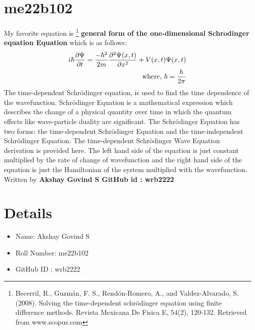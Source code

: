 \section*{me22b102}
My favorite equation is \footnote[1]{Becerril, R., Guzmán, F. S., Rendón-Romero, A., and Valdez-Alvarado, S. (2008). Solving the time-dependent schrödinger equation using finite difference methods. Revista Mexicana De Fisica E, 54(2), 120-132. Retrieved from www.scopus.com } \textbf{general form of the one-dimensional  Schr$\mathbf{\ddot{o}}$dinger equation  Equation} which is as follows: 
\begin{eqnarray}
    \label{Schrodinger's equation}
    i\hbar{\partial \Psi \over \partial t} = {- \hbar^2 \over 2m} {\partial^2 \Psi(x,t) \over \partial x^2} + V(x,t)\Psi(x,t)
    \\ \textrm{where, } \hbar = \frac{h}{2 \pi}    
\end{eqnarray}
The time-dependent Schrödinger equation, is used to find the time dependence of the wavefunction.
Schrödinger Equation is a mathematical expression which describes the change of a physical quantity
over time in which the quantum effects like wave-particle duality are significant. The Schrödinger
Equation has two forms: the time-dependent Schrödinger Equation and the time-independent Schrödinger
Equation. The time-dependent Schrödinger Wave Equation derivation is provided here. The left hand side 
of the equation is just constant multiplied by the rate of change of wavefunction and the right hand side 
of the equation is just the Hamiltonian of the system multiplied with the wavefunction. Written by \textbf{Akshay Govind S 
GitHub id : wrb2222}

\section*{Details}
\begin{itemize}
    \item Name: Akshay Govind S 
    \item Roll Number: me22b102
    \item GitHub ID : wrb2222
\end{itemize}



